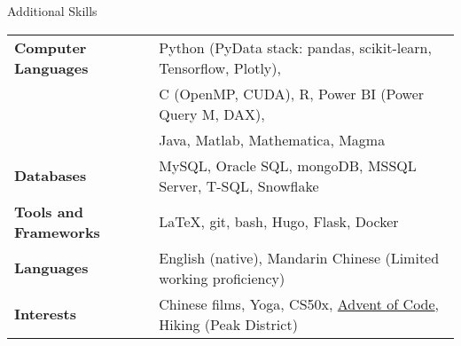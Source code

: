 \documentclass{resume} %
\begin{document}
\begin{rSection}{Additional Skills}
	
	\begin{tabular}{ @{} >{\bfseries}l @{\hspace{6ex}} l }
		Computer Languages & Python (PyData stack: pandas, scikit-learn, Tensorflow, Plotly), \\
		& C (OpenMP, CUDA), R, Power BI (Power Query M, DAX), \\
		& Java, Matlab, Mathematica, Magma \\
		Databases & MySQL, Oracle SQL, mongoDB, MSSQL Server, T-SQL, Snowflake \\
		Tools and Frameworks & LaTeX, git, bash, Hugo, Flask, Docker \\
		Languages & English (native), Mandarin Chinese (Limited working proficiency) \smallskip \\
		Interests & Chinese films, Yoga, CS50x,  \href{https://github.com/edwardmpearce/adventofcode}{Advent of Code}, Hiking (Peak District)
	\end{tabular}
	
\end{rSection}





\end{document}
